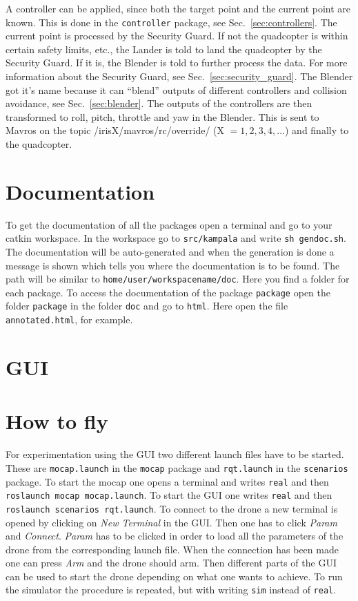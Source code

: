 \documentclass[titlepage,11pt,a4paper]{article}
\begin{document}
A controller can be applied, since both the target point and the
current point are known. This is done in the \texttt{controller}
package, see Sec.~\ref{sec:controllers}. The current point is processed by the Security Guard. If not
the quadcopter is within certain safety limits, etc., the Lander
is told to land the quadcopter by the Security Guard. If it is, the
Blender is told to further process the data. For more information
about the Security Guard, see Sec.~\ref{sec:security_guard}. The
Blender got it's name because it can ``blend'' outputs of different
controllers and collision avoidance, see Sec.~\ref{sec:blender}. The
outputs of the controllers are then transformed to roll, pitch,
throttle and yaw in the Blender. This is sent to Mavros on the
topic /irisX/mavros/rc/override/ (X $= 1, 2, 3, 4, \dots$) and finally
to the quadcopter.

\section{Documentation}
\label{sec:documentation}

To get the documentation of all the packages open a terminal and go to your catkin workspace. In the workspace go to \texttt{src/kampala} and write \texttt{sh gen\textunderscore doc.sh}. The documentation will be auto-generated and when the generation is done a message is shown which tells you where the documentation is to be found. The path will be similar to \texttt{home/user/workspace\textunderscore name/doc}. Here you find a folder for each package. To access the documentation of the package \texttt{package} open the folder \texttt{package} in the folder \texttt{doc} and go to \texttt{html}. Here open the file \texttt{annotated.html}, for example.



\section{GUI}
\label{sec:gui}


\section{How to fly}
For experimentation using the GUI two different launch files have to
be started. These are \texttt{mocap.launch} in the \texttt{mocap}
package and \texttt{rqt.launch} in the \texttt{scenarios} package. To
start the mocap one opens a terminal and writes \texttt{real} and then
\texttt{roslaunch mocap mocap.launch}. To start the GUI one writes
\texttt{real} and then \texttt{roslaunch scenarios rqt.launch}. To
connect to the drone a new terminal is opened by clicking on
\textit{New Terminal} in the GUI. Then one has to click \textit{Param}
and \textit{Connect}. \textit{Param} has to be clicked in order to
load all the parameters of the drone from the corresponding launch
file. When the connection has been made one can press \textit{Arm} and
the drone should arm. Then different parts of the GUI can be used to
start the drone depending on what one wants to achieve. To run the
simulator the procedure is repeated, but with writing \texttt{sim}
instead of \texttt{real}.
\end{document}
